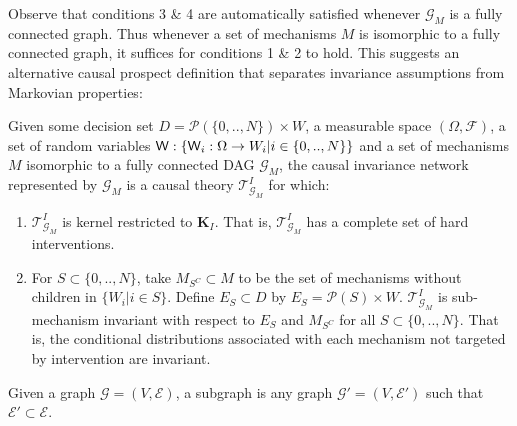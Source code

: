 Observe that conditions 3 \& 4 are automatically satisfied whenever $\mathcal{G}_M$ is a fully connected graph. Thus whenever a set of mechanisms $M$ is isomorphic to a fully connected graph, it suffices for conditions 1 \& 2 to hold. This suggests an alternative causal prospect definition that separates invariance assumptions from Markovian properties:

\begin{definition}
Given some  decision set $D=\mathscr{P}(\{0,..,N\})\times W$, a measurable space $(\Omega,\mathcal{F})$, a set of random variables $\mathsf{W}:\{\mathsf{W}_i:\Omega\to W_i|i\in \{0,..,N\}\}$ and a set of mechanisms $M$ isomorphic to a fully connected DAG $\mathcal{G}_M$, the causal invariance network represented by $\mathcal{G}_M$ is a causal theory $\mathscr{T}^I_{\mathcal{G}_M}$ for which:
\begin{enumerate}
    \item $\mathscr{T}^I_{\mathcal{G}_M}$ is kernel restricted to $\mathbf{K}_I$. That is, $\mathscr{T}^I_{\mathcal{G}_M}$ has a complete set of hard interventions.
    \item For $S\subset \{0,..,N\}$, take $M_{S^C}\subset M$ to be the set of mechanisms without children in $\{W_i|i\in S\}$. Define $E_S\subset D$ by $E_S = \mathscr{P}(S)\times W$. $\mathscr{T}^I_{\mathcal{G}_M}$ is sub-mechanism invariant with respect to $E_S$ and $M_{S^C}$ for all $S\subset\{0,..,N\}$. That is, the conditional distributions associated with each mechanism not targeted by intervention are invariant.
\end{enumerate}
\end{definition}

\begin{definition}[Subgraph]
Given a graph $\mathcal{G}=(V,\mathcal{E})$, a subgraph is any graph $\mathcal{G}'=(V,\mathcal{E}')$ such that $\mathcal{E}'\subset\mathcal{E}$.
\end{definition}

